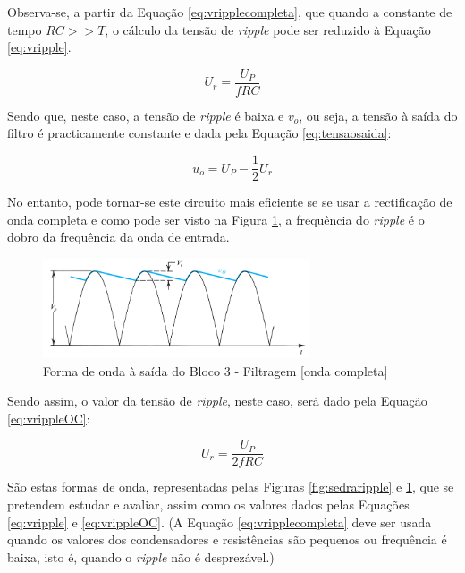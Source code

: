Observa-se, a partir da Equação \ref{eq:vripplecompleta}, que quando a constante de tempo $RC >> T$, o cálculo da tensão de \textit{ripple} pode ser reduzido à Equação \ref{eq:vripple}.

\begin{equation} \label{eq:vripple}
	U_{r} = \frac{U_{P}}{fRC}
\end{equation}

Sendo que, neste caso, a tensão de \textit{ripple} é baixa e $v_{o}$, ou seja, a tensão à saída do filtro é practicamente constante e dada pela Equação \ref{eq:tensaosaida}:

\begin{equation} \label{eq:tensaosaida}
	u_{o} = U_{P} - \dfrac{1}{2}U_{r}	
\end{equation}

No entanto, pode tornar-se este circuito mais eficiente se se usar a rectificação de onda completa e como pode ser visto na Figura \ref{fig:sedraripplecompleta}, a frequência do \textit{ripple} é o dobro da frequência da onda de entrada.

\begin{figure}[hbtp]
	\centering
	\includegraphics[width=0.7\textwidth]{figures/sedra_ripple_OC.png}
	\caption{Forma de onda à saída do Bloco 3 - Filtragem [onda completa] \cite{sedrasmith}}
	\label{fig:sedraripplecompleta}
\end{figure}

Sendo assim, o valor da tensão de \textit{ripple}, neste caso, será dado pela Equação \ref{eq:vrippleOC}:

\begin{equation} \label{eq:vrippleOC}
	U_{r} = \frac{U_{P}}{2fRC}
\end{equation}

São estas formas de onda, representadas pelas Figuras \ref{fig:sedraripple} e \ref{fig:sedraripplecompleta}, que se pretendem estudar e avaliar, assim como os valores dados pelas Equações \ref{eq:vripple} e \ref{eq:vrippleOC}. (A Equação \ref{eq:vripplecompleta} deve ser usada quando os valores dos condensadores e resistências são pequenos ou frequência é baixa, isto é, quando o \textit{ripple} não é desprezável.)

